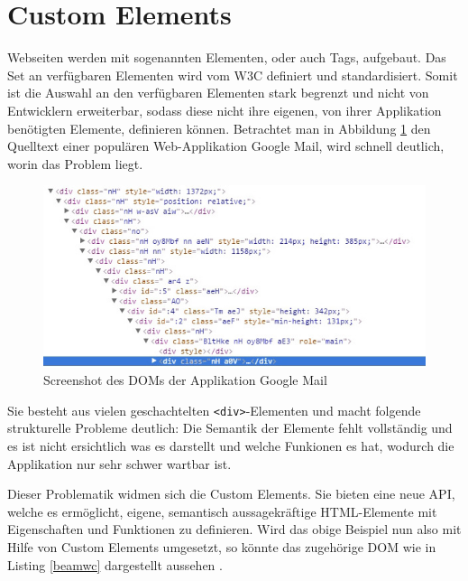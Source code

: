 \section{Custom Elements}\label{custom-elements}

Webseiten werden mit sogenannten Elementen, oder auch Tags, aufgebaut. Das Set an verfügbaren Elementen wird vom \ac{W3C} definiert und standardisiert. Somit ist die Auswahl an den verfügbaren Elementen stark begrenzt und nicht von Entwicklern erweiterbar, sodass diese nicht ihre eigenen, von ihrer Applikation benötigten Elemente, definieren können. Betrachtet man in Abbildung \ref{fig:cusel} den Quelltext einer populären Web-Applikation Google Mail, wird schnell deutlich, worin das Problem liegt.

\begin{figure}[htbp]
 \centering
 \includegraphics[width=13cm]{kapitel2/bilder/2-custom-elements-div-suppe}
 \caption{Screenshot des DOMs der Applikation Google Mail}
 \label{fig:cusel}
\end{figure}

Sie besteht aus vielen geschachtelten \texttt{\textless{}div\textgreater{}}-Elementen und macht folgende strukturelle Probleme deutlich: Die Semantik der Elemente fehlt vollständig und es ist nicht ersichtlich was es darstellt und welche Funkionen es hat, wodurch die Applikation nur sehr schwer wartbar ist.

Dieser Problematik widmen sich die Custom Elements. Sie bieten eine neue \ac{API}, welche es ermöglicht, eigene, semantisch aussagekräftige \ac{HTML}-Elemente mit Eigenschaften und Funktionen zu definieren. Wird das obige Beispiel nun also mit Hilfe von Custom Elements umgesetzt, so könnte das zugehörige \ac{DOM} wie in Listing \ref{beamwc} dargestellt aussehen \cite{citeulike:13844982}.



